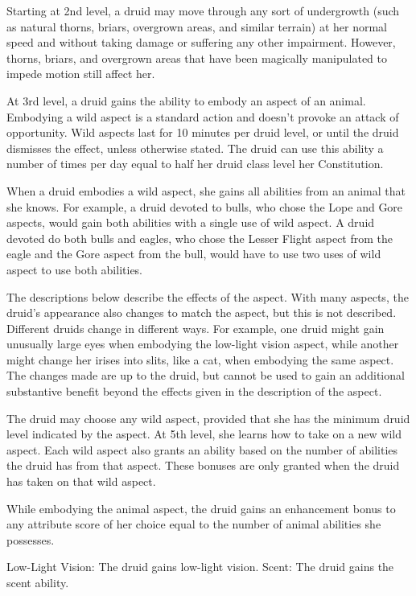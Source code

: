  Starting at 2nd level, a druid may move through any sort of undergrowth (such as natural thorns, briars, overgrown areas, and similar terrain) at her normal speed and without taking damage or suffering any other impairment. However, thorns, briars, and overgrown areas that have been magically manipulated to impede motion still affect her.

  At 3rd level, a druid gains the ability to embody an aspect of an animal. Embodying a wild aspect is a standard action and doesn't provoke an attack of opportunity. Wild aspects last for 10 minutes per druid level, or until the druid dismisses the effect, unless otherwise stated. The druid can use this ability a number of times per day equal to half her druid class level \add her Constitution.
\par When a druid embodies a wild aspect, she gains all abilities from an animal that she knows. For example, a druid devoted to bulls, who chose the Lope and Gore aspects, would gain both abilities with a single use of wild aspect. A druid devoted do both bulls and eagles, who chose the Lesser Flight aspect from the eagle and the Gore aspect from the bull, would have to use two uses of wild aspect to use both abilities.
\par The descriptions below describe the effects of the aspect. With many aspects, the druid's appearance also changes to match the aspect, but this is not described. Different druids change in different ways. For example, one druid might gain unusually large eyes when embodying the low-light vision aspect, while another might change her irises into slits, like a cat, when embodying the same aspect. The changes made are up to the druid, but cannot be used to gain an additional substantive benefit beyond the effects given in the description of the aspect.
\par The druid may choose any wild aspect, provided that she has the minimum druid level indicated by the aspect. At 5th level, she learns how to take on a new wild aspect. Each wild aspect also grants an ability based on the number of abilities the druid has from that aspect. These bonuses are only granted when the druid has taken on that wild aspect.

While embodying the animal aspect, the druid gains an enhancement bonus to any attribute score of her choice equal to the number of animal abilities she possesses.
\begin{wildaspect}
\wilditem Low-Light Vision: The druid gains low-light vision.
\wilditem Scent: The druid gains the scent ability.
\end{wildaspect}

